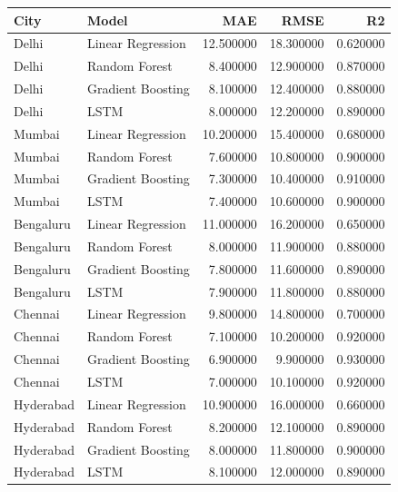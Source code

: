 \begin{tabular}{llrrr}
\toprule
City & Model & MAE & RMSE & R2 \\
\midrule
Delhi & Linear Regression & 12.500000 & 18.300000 & 0.620000 \\
Delhi & Random Forest & 8.400000 & 12.900000 & 0.870000 \\
Delhi & Gradient Boosting & 8.100000 & 12.400000 & 0.880000 \\
Delhi & LSTM & 8.000000 & 12.200000 & 0.890000 \\
Mumbai & Linear Regression & 10.200000 & 15.400000 & 0.680000 \\
Mumbai & Random Forest & 7.600000 & 10.800000 & 0.900000 \\
Mumbai & Gradient Boosting & 7.300000 & 10.400000 & 0.910000 \\
Mumbai & LSTM & 7.400000 & 10.600000 & 0.900000 \\
Bengaluru & Linear Regression & 11.000000 & 16.200000 & 0.650000 \\
Bengaluru & Random Forest & 8.000000 & 11.900000 & 0.880000 \\
Bengaluru & Gradient Boosting & 7.800000 & 11.600000 & 0.890000 \\
Bengaluru & LSTM & 7.900000 & 11.800000 & 0.880000 \\
Chennai & Linear Regression & 9.800000 & 14.800000 & 0.700000 \\
Chennai & Random Forest & 7.100000 & 10.200000 & 0.920000 \\
Chennai & Gradient Boosting & 6.900000 & 9.900000 & 0.930000 \\
Chennai & LSTM & 7.000000 & 10.100000 & 0.920000 \\
Hyderabad & Linear Regression & 10.900000 & 16.000000 & 0.660000 \\
Hyderabad & Random Forest & 8.200000 & 12.100000 & 0.890000 \\
Hyderabad & Gradient Boosting & 8.000000 & 11.800000 & 0.900000 \\
Hyderabad & LSTM & 8.100000 & 12.000000 & 0.890000 \\
\bottomrule
\end{tabular}
